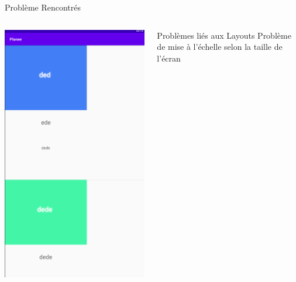 \documentclass[11pt]{beamer}
\begin{document}
\begin{frame}{Problème Rencontrés}


\begin{columns}

\includegraphics[scale=0.4]{BugLayout}

\begin{mybox}{Problèmes liés aux Layouts}
Problème de mise à l'échelle selon la taille de l'écran 
\end{mybox}


\end{columns}
\end{frame}
\end{document}
